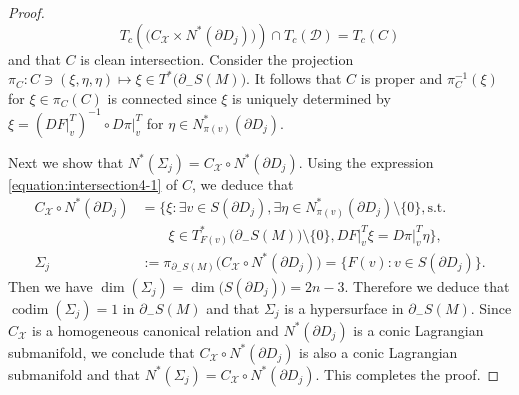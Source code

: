\documentclass[10pt,a4paper]{amsart}
\begin{document}
\begin{proof}
%
%
$$
T_c(\bigl(C_\mathcal{X}{\times}N^\ast(\partial{D_j})\bigr)){\cap}T_c(\mathcal{D})=T_c(C)
$$
%
% 
and that $C$ is clean intersection. 
Consider the projection 
$\pi_C:C\ni(\xi,\eta,\eta) \mapsto \xi \in T^\ast\bigl(\partial_-S(M)\bigr)$.  
It follows that $C$ is proper and $\pi_C^{-1}(\xi)$ for $\xi \in \pi_C(C)$ is connected since $\xi$ is uniquely determined by 
$\xi=(DF\vert^T_v)^{-1}{\circ}D\pi\vert^T_v$ for 
$\eta \in N^\ast_{\pi(v)}(\partial{D_j})$.    
%
%
\par
%
%
Next we show that $N^\ast(\Sigma_j)=C_\mathcal{X}{\circ}N^\ast(\partial{D_j})$. 
Using the expression \eqref{equation:intersection4-1} of $C$, we deduce that 
%
%
\begin{align}
  C_\mathcal{X}{\circ}N^\ast(\partial{D_j})
& =
  \bigl\{
  \xi: 
  \exists v \in S({\partial}D_j), \exists \eta \in N^\ast_{\pi(v)}(\partial{D_j})\setminus\{0\}, \text{s.t.}\
\nonumber
\\
& \qquad   
  \xi \in T^\ast_{F(v)}\bigl(\partial_-S(M)\bigr)\setminus\{0\},
  DF\vert^T_v\xi=D\pi\vert^T_v\eta\bigr\},
\label{equation:nstarsigmaj}
\\
  \Sigma_j
& :=
  \pi_{\partial_-S(M)}\bigl(C_\mathcal{X}{\circ}N^\ast(\partial{D_j})\bigr)
  =
  \{F(v) : v \in S(\partial{D_j})\}.
\nonumber 
\end{align}
%
%
Then we have $\operatorname{dim}(\Sigma_j)=\operatorname{dim}\bigl(S(\partial{D_j})\bigr)=2n-3$. 
Therefore we deduce that 
$\operatorname{codim}(\Sigma_j)=1$ in $\partial_-S(M)$ 
and that $\Sigma_j$ is a hypersurface in $\partial_-S(M)$. 
Since $C_\mathcal{X}$ is a homogeneous canonical relation and 
$N^\ast(\partial{D_j})$ is a conic Lagrangian submanifold, 
we conclude that $C_\mathcal{X}{\circ}N^\ast(\partial{D_j})$ is also a conic Lagrangian submanifold 
and that $N^\ast(\Sigma_j)=C_\mathcal{X}{\circ}N^\ast(\partial{D_j})$. 
This completes the proof. 
\end{proof}
\end{document}

